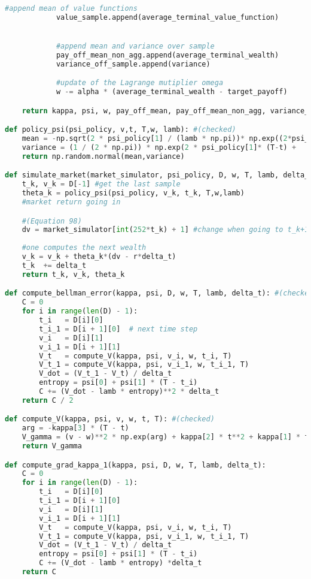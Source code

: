 \documentclass[oneside, a4paper, onecolumn, 11pt]{article}
\begin{document}
\begin{lstlisting}[language=Python, caption=EMV Portfolio Selection Algorithm, label=code:emv]
            #append mean of value functions
            value_sample.append(average_terminal_value_function)


            #append mean and variance over sample
            pay_off_mean_non_agg.append(average_terminal_wealth)
            variance_off_sample.append(variance)

            #update of the Lagrange mutiplier omega 
            w -= alpha * (average_terminal_wealth - target_payoff)

    return kappa, psi, w, pay_off_mean, pay_off_mean_non_agg, variance_off_sample, ratio_risky_asset_sample, ratio_risky_over_time, value_sample

def policy_psi(psi_policy, v,t, T,w, lamb): #(checked)
    mean = -np.sqrt(2 * psi_policy[1] / (lamb * np.pi))* np.exp((2*psi_policy[0]-1)/2) * ((v - w))  
    variance = (1 / (2 * np.pi)) * np.exp(2 * psi_policy[1]* (T-t) +  (2 * psi_policy[0] - 1))
    return np.random.normal(mean,variance)

def simulate_market(market_simulator, psi_policy, D, w, T, lamb, delta_t,r):
    t_k, v_k = D[-1] #get the last sample
    theta_k = policy_psi(psi_policy, v_k, t_k, T,w,lamb)
    #market return going in 

    #(Equation 98)
    dv = market_simulator[int(252*t_k) + 1] #change when going to t_k+1
    
    #one computes the next wealth  
    v_k = v_k + theta_k*(dv - r*delta_t) 
    t_k  += delta_t
    return t_k, v_k, theta_k 

def compute_bellman_error(kappa, psi, D, w, T, lamb, delta_t): #(checked)
    C = 0 
    for i in range(len(D) - 1):
        t_i   = D[i][0]
        t_i_1 = D[i + 1][0]  # next time step
        v_i   = D[i][1]
        v_i_1 = D[i + 1][1]
        V_t   = compute_V(kappa, psi, v_i, w, t_i, T)
        V_t_1 = compute_V(kappa, psi, v_i_1, w, t_i_1, T)
        V_dot = (V_t_1 - V_t) / delta_t 
        entropy = psi[0] + psi[1] * (T - t_i)
        C += (V_dot - lamb * entropy)**2 * delta_t
    return C / 2

def compute_V(kappa, psi, v, w, t, T): #(checked)
    arg = -kappa[3] * (T - t)
    V_gamma = (v - w)**2 * np.exp(arg) + kappa[2] * t**2 + kappa[1] * t + kappa[0]
    return V_gamma

def compute_grad_kappa_1(kappa, psi, D, w, T, lamb, delta_t):
    C = 0 
    for i in range(len(D) - 1):
        t_i   = D[i][0]
        t_i_1 = D[i + 1][0]
        v_i   = D[i][1]
        v_i_1 = D[i + 1][1]
        V_t   = compute_V(kappa, psi, v_i, w, t_i, T)
        V_t_1 = compute_V(kappa, psi, v_i_1, w, t_i_1, T)
        V_dot = (V_t_1 - V_t) / delta_t 
        entropy = psi[0] + psi[1] * (T - t_i)
        C += (V_dot - lamb * entropy) *delta_t  
    return C


\end{lstlisting}
\end{document}
